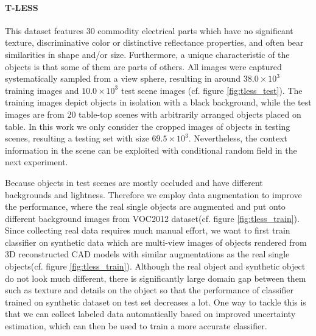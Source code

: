 

\paragraph{T-LESS\cite{hodan2017tless}} This dataset features 30 commodity electrical parts which have no significant texture, discriminative color or distinctive reflectance properties, and often bear similarities in shape and/or size. Furthermore, a unique characteristic of the objects is that some of them are parts of others. All images were captured systematically sampled from a view sphere, resulting in around $38.0\times10^3$ training images and $10.0\times10^3$ test scene images (cf. figure \ref{fig:tless_test}). The training images depict objects in isolation with a black background, while the test images are from 20 table-top scenes with arbitrarily arranged objects placed on table. In this work we only consider the cropped images of objects in testing scenes, resulting a testing set with size $69.5\times10^3$. Nevertheless, the context information in the scene can be exploited with conditional random field in the next experiment.

Because objects in test scenes are mostly occluded and have different backgrounds and lightness. Therefore we employ data augmentation to improve the performance, where the real single objects are augmented and put onto different background images from VOC2012 dataset\cite{pascal-voc-2012}(cf. figure \ref{fig:tless_train}). Since collecting real data requires much manual effort, we want to first train classifier on synthetic data which are multi-view images of objects rendered from 3D reconstructed CAD models with similar augmentations as the real single objects(cf. figure \ref{fig:tless_train}). Although the real object and synthetic object do not look much different, there is significantly large domain gap between them such as texture and details on the object so that the performance of classifier trained on synthetic dataset on test set decreases a lot. One way to tackle this is that we can collect labeled data automatically based on improved uncertainty estimation, which can then be used to train a more accurate classifier.


